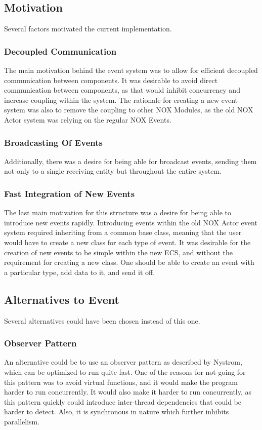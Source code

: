 \subsection{Motivation}
Several factors motivated the current implementation.

\subsubsection{Decoupled Communication}
The main motivation behind the event system was to allow for efficient decoupled communication between components.
It was desirable to avoid direct communication between components, as that would inhibit concurrency and increase coupling within the system.
The rationale for creating a new event system was also to remove the coupling to other NOX Modules, as the old NOX Actor system was relying on the regular NOX Events.

\subsubsection{Broadcasting Of Events}
Additionally, there was a desire for being able for broadcast events, sending them not only to a single receiving entity but throughout the entire system.

\subsubsection{Fast Integration of New Events}
The last main motivation for this structure was a desire for being able to introduce new events rapidly.
Introducing events within the old NOX Actor event system required inheriting from a common base class, meaning that the user would have to create a new class for each type of event.
It was desirable for the creation of new events to be simple within the new ECS, and without the requirement for creating a new class.
One should be able to create an event with a particular type, add data to it, and send it off.

\subsection{Alternatives to Event}
Several alternatives could have been chosen instead of this one.

\subsubsection{Observer Pattern}
An alternative could be to use an observer pattern as described by Nystrom\cite[Observer]{game_programming_patterns}, which can be optimized to run quite fast.
One of the reasons for not going for this pattern was to avoid virtual functions, and it would make the program harder to run concurrently.
It would also make it harder to run concurrently,
as this pattern quickly could introduce inter-thread dependencies
that could be harder to detect.
Also, it is synchronous in nature which further inhibits parallelism.

